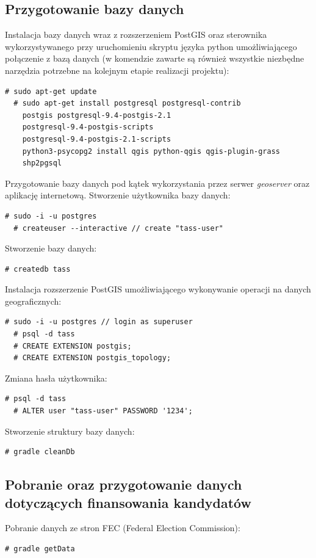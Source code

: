 \documentclass[10pt,a4paper]{article}
\begin{document}
\subsection{Przygotowanie bazy danych}
\bigskip \noindent
Instalacja bazy danych wraz z rozszerzeniem PostGIS oraz sterownika wykorzystywanego przy uruchomieniu skryptu języka python umożliwiającego połączenie z bazą danych (w komendzie zawarte są również wszystkie niezbędne narzędzia potrzebne na kolejnym etapie realizacji projektu):
\begin{lstlisting}[style=BashInputStyle]
  # sudo apt-get update
  # sudo apt-get install postgresql postgresql-contrib 
  	postgis postgresql-9.4-postgis-2.1
  	postgresql-9.4-postgis-scripts 
  	postgresql-9.4-postgis-2.1-scripts
  	python3-psycopg2 install qgis python-qgis qgis-plugin-grass
  	shp2pgsql
\end{lstlisting}

\bigskip \noindent
Przygotowanie bazy danych pod kątek wykorzystania przez serwer \textit{geoserver} oraz aplikację internetową. Stworzenie użytkownika bazy danych:
\begin{lstlisting}[style=BashInputStyle]
  # sudo -i -u postgres
  # createuser --interactive // create "tass-user"
\end{lstlisting}

\bigskip \noindent
Stworzenie bazy danych:
\begin{lstlisting}[style=BashInputStyle]
  # createdb tass
\end{lstlisting}

\bigskip \noindent
Instalacja rozszerzenie PostGIS umożliwiającego wykonywanie operacji na danych geograficznych:
\begin{lstlisting}[style=BashInputStyle]
  # sudo -i -u postgres // login as superuser
  # psql -d tass
  # CREATE EXTENSION postgis;
  # CREATE EXTENSION postgis_topology;
\end{lstlisting}

\bigskip \noindent
Zmiana hasła użytkownika:
\begin{lstlisting}[style=BashInputStyle]
  # psql -d tass
  # ALTER user "tass-user" PASSWORD '1234';
\end{lstlisting}

\bigskip \noindent
Stworzenie struktury bazy danych:
\begin{lstlisting}[style=BashInputStyle]
  # gradle cleanDb
\end{lstlisting}

\subsection{Pobranie oraz przygotowanie danych dotyczących finansowania kandydatów}
\bigskip \noindent
Pobranie danych ze stron FEC (Federal Election Commission):
\begin{lstlisting}[style=BashInputStyle]
  # gradle getData
\end{lstlisting}
\end{document}
